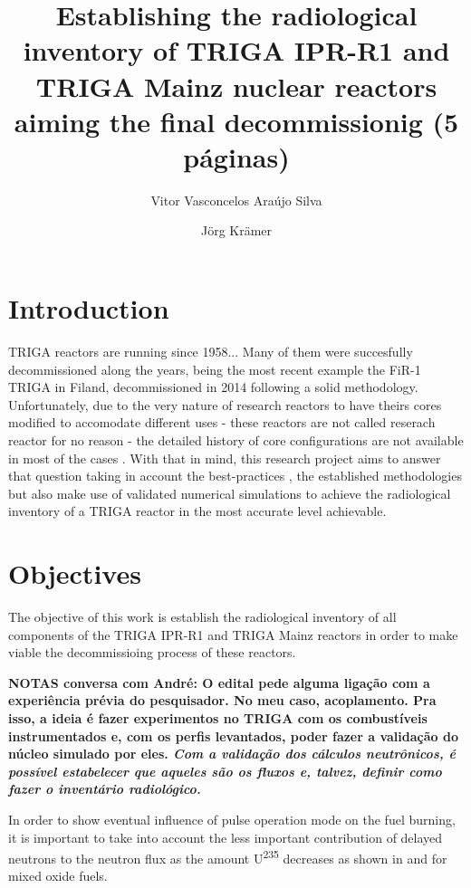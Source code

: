 \documentclass[11pt]{article} %
\title{Establishing the radiological inventory of TRIGA IPR-R1 and TRIGA Mainz nuclear reactors aiming the final decommissionig (5 páginas)}
\author[1]{Vitor Vasconcelos Araújo Silva}
\author[2]{Jörg Krämer}
\affil[1]{CDTN}
\affil[2]{Mainz}
\date{} %
\begin{document}
\maketitle

\section{Introduction}

TRIGA reactors are running since 1958...
Many of them were succesfully decommissioned along the years, being the most recent example the FiR-1 TRIGA in Filand, decommissioned in 2014 \cite{Raty_Thesis_2020} following a solid methodology. Unfortunately, due to the very nature of research reactors to have theirs cores modified to accomodate different uses - these reactors are not called reserach reactor for no reason - the detailed history of core configurations are not available in most of the cases \cite[p. xxx]{Clean-up_CEA-e-DEN_2018}. With that in mind, this research project aims to answer that question taking in account the best-practices \cite{AIEA}, the established methodologies \cite{Raty_paper} but also make use of validated numerical simulations to achieve the radiological inventory of a TRIGA reactor in the most accurate level achievable.

\section{Objectives}

The objective of this work is establish the radiological inventory of all components of the TRIGA IPR-R1 and TRIGA Mainz reactors in order to make viable the decommissioing process of these reactors.

\textbf{NOTAS conversa com André: O edital pede alguma ligação com a experiência prévia do pesquisador. No meu caso, acoplamento. Pra isso, a ideia é fazer experimentos no TRIGA com os combustíveis instrumentados e, com os perfis levantados, poder fazer a validação do núcleo simulado por eles. \textit{Com a validação dos cálculos neutrônicos, é possível estabelecer que aqueles são os fluxos e, talvez, definir como fazer o inventário radiológico.}}

In order to show eventual influence of pulse operation mode on the fuel burning, it is important to take into account the less important contribution of delayed neutrons to the neutron flux as the amount U\textsuperscript{235} decreases as shown in \cite{Carvalho2024} and \cite{Carvalho2025} for mixed oxide fuels.
\end{document}
